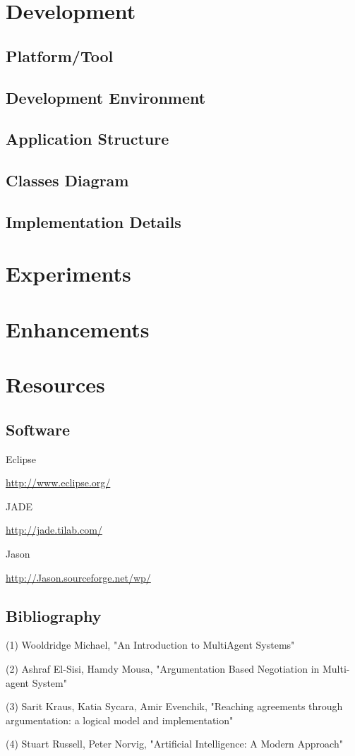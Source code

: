 \documentclass{article}
\begin{document}
\section{Development}
\subsection{Platform/Tool}
\subsection{Development Environment}
\subsection{Application Structure}
\subsection{Classes Diagram}
\subsection{Implementation Details}
\section{Experiments}
\section{Enhancements}
\section{Resources}

\subsection{Software}
Eclipse \par
\url{http://www.eclipse.org/} \par
\vspace{3mm}
JADE \par
\url{http://jade.tilab.com/} \par 
\vspace{3mm}
Jason \par
\url{http://Jason.sourceforge.net/wp/} \par 

\subsection{Bibliography}
\noindent
(1) Wooldridge Michael, "An Introduction to MultiAgent Systems"

\noindent
(2) Ashraf El-Sisi, Hamdy Mousa, "Argumentation Based Negotiation in Multi-agent System"

\noindent
(3) Sarit Kraus, Katia Sycara, Amir Evenchik, "Reaching agreements through argumentation: a logical model and implementation"

\noindent
(4) Stuart Russell, Peter Norvig, "Artificial Intelligence: A Modern Approach"
\end{document}
